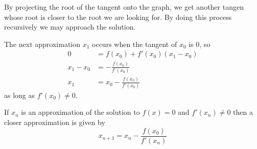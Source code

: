 \documentclass{article}
\begin{document}
By projecting the root of the tangent onto the graph, we get another tangen whose root is closer
to the root we are looking for. By doing this process recursively we may approach the solution.

The next approximation \(x_1\) occurs when the tangent of \(x_0\) is 0, so
\begin{align*}
    0 &= f(x_0) + f'(x_0)(x_1 - x_0) \\
    x_1 - x_0 &= - \frac{f(x_0)}{f'(x_0)} \\
    x_1 &= x_0 - \frac{f(x_0)}{f'(x_0)}
\end{align*}
as long as \(f'(x_0) \neq 0\).

If \(x_n\) is an approximation of the solution to \(f(x)=0\) and \(f'(x_n) \neq 0\) then a closer approximation is given by
\[
    x_{n+1} = x_n - \frac{f(x_0)}{f'(x_n)}
\]

\pagebreak
\end{document}
